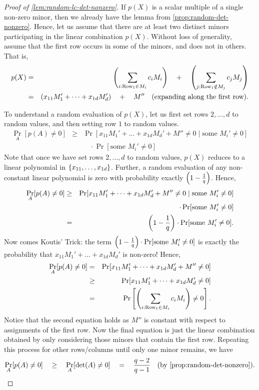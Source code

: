\begin{proof}[Proof of \autoref{lem:random-lc-det-nonzero}]
  If $p(X)$ is a scalar multiple of a single non-zero minor, then we
  already have the lemma from
  \autoref{prop:random-det-nonzero}. 
Hence, let us assume that
  there are at least two distinct minors participating in the linear
  combination $p(X)$. 
Without loss of generality, assume that the
  first row occurs in some of the minors, and does not in others. 
That is, 
  \begin{eqnarray*}
    p(X) &=& \left(\sum_{i:\text{Row}_1\in M_i} c_i M_i\right) \quad+ \quad \left(\sum_{j:\text{Row}_1\notin M_j} c_j M_j\right)\\
     & = & \left(x_{11} M_1' + \dots + x_{1d} M_{d}'\right) \quad+\quad M'' \quad\text{(expanding along the first row)}.
  \end{eqnarray*}
  
  To understand a random evaluation of $p(X)$, let us first set rows
  $2, \dots, d$ to random values, and then setting row $1$ to random
  values.
  \begin{eqnarray*}
    \Pr_{A}[p(A)\neq 0] & \geq & \Pr[x_{11} M_1' + \dots + x_{1d} M_d' + M'' \neq 0 \;|\; \text{some }M_{i}'\neq 0]\\
    & & \quad \cdot \Pr[\text{some }M_i' \neq 0]
  \end{eqnarray*}
  Note that once we have set rows $2,\dots, d$ to random values,
  $p(X)$ reduces to a linear polynomial in $\left\{x_{11},\dots,
    x_{1d}\right\}$. 
Further, a random evaluation of any non-constant linear
  polynomial is zero with probability exactly $\left(1
    -\frac{1}{q}\right)$. 
Hence,
  \begin{eqnarray*}
\Pr_{A}[p(A)\neq 0] & \geq & \Pr[x_{11} M_1' + \dots + x_{1d} M_d' + M'' \neq 0 \;|\; \text{some }M_{i}'\neq 0]\\
 & & \quad \cdot \Pr[\text{some }M_i' \neq 0]\\
    & = & \left(1 - \frac{1}{q}\right)\cdot \Pr[\text{some }M_i' \neq 0].
  \end{eqnarray*}
  Now comes  Koutis' Trick: the term $\left(1 -
    \frac{1}{q}\right) \cdot \Pr[\text{some }M_i' \neq 0]$ is exactly the
  probability that $x_{11}M_1' + \dots + x_{1d}M_d'$ is non-zero! 
Hence,
\begin{eqnarray*}
\Pr_{A}[p(A) \neq 0] & = & \Pr[ x_{11}M_1' + \dots + x_{1d} M_d' + M''\neq 0]\\
 & \geq & \Pr[ x_{11}M_1' + \dots + x_{1d} M_d'\neq 0]\\
 & = & \Pr\left[\left(\sum_{i:\text{Row}_1\in M_i} c_i M_i\right) \neq 0\right].
\end{eqnarray*}
Notice that the second equation holds as $M''$ is constant with respect to assignments of the first row.
Now the final equation is just the linear combination obtained by only considering
those minors that contain the first row. 
Repeating this process for other
rows/columns until only  one minor remains, we have
$$
\Pr_{A}[p(A) \neq 0] \quad \geq \quad \Pr_{A}[\det(A) \neq 0] \quad = \quad
\frac{q-2}{q-1}\quad(\text{by \autoref{prop:random-det-nonzero}}).\qedhere
$$
\end{proof}


